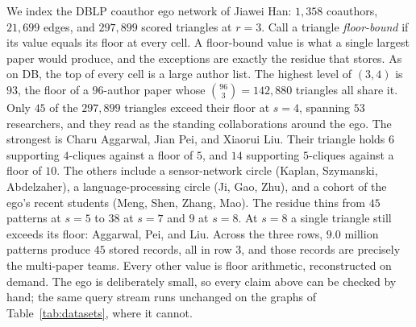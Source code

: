 We index the DBLP coauthor ego network of Jiawei Han: $1{,}358$ coauthors, $21{,}699$ edges, and $297{,}899$ scored triangles at $r=3$.
%
Call a triangle \emph{floor-bound} if its value equals its floor at every cell.
%
A floor-bound value is what a single largest paper would produce, and the exceptions are exactly the residue that \nsi{} stores.
%
As on DB, the top of every cell is a large author list.
%
The highest level of $(3,4)$ is $93$, the floor of a $96$-author paper whose $\binom{96}{3}=142{,}880$ triangles all share it.
%
Only $45$ of the $297{,}899$ triangles exceed their floor at $s=4$, spanning $53$ researchers, and they read as the standing collaborations around the ego.
%
The strongest is Charu Aggarwal, Jian Pei, and Xiaorui Liu.
%
Their triangle holds $6$ supporting $4$-cliques against a floor of $5$, and $14$ supporting $5$-cliques against a floor of $10$.
%
The others include a sensor-network circle (Kaplan, Szymanski, Abdelzaher), a language-processing circle (Ji, Gao, Zhu), and a cohort of the ego's recent students (Meng, Shen, Zhang, Mao).
%
The residue thins from $45$ patterns at $s=5$ to $38$ at $s=7$ and $9$ at $s=8$.
%
At $s=8$ a single triangle still exceeds its floor: Aggarwal, Pei, and Liu.
%
Across the three rows, $9.0$ million patterns produce $45$ stored records, all in row $3$, and those records are precisely the multi-paper teams.
%
Every other value is floor arithmetic, reconstructed on demand.
%
The ego is deliberately small, so every claim above can be checked by hand; the same query stream runs unchanged on the graphs of Table~\ref{tab:datasets}, where it cannot.
